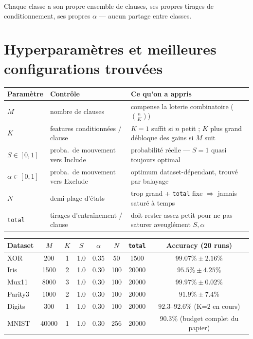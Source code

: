 \documentclass[12pt,a4paper]{article}
\newcommand{\Inc}{\ensuremath{\mathrm{Include}}}
\newcommand{\Exc}{\ensuremath{\mathrm{Exclude}}}
\newcommand{\code}[1]{\texttt{#1}}
\theoremstyle{remark}
\begin{document}
Chaque classe a son propre ensemble de clauses, ses propres tirages de
conditionnement, ses propres $\alpha$ --- aucun partage entre classes.

\section{Hyperparamètres et meilleures configurations trouvées}

\begin{center}
\renewcommand{\arraystretch}{1.3}
\begin{tabular}{lll}
\toprule
Paramètre & Contrôle & Ce qu'on a appris \\
\midrule
$M$ & nombre de clauses & compense la loterie combinatoire ($\binom{n}{K}$) \\
$K$ & features conditionnées / clause & $K{=}1$ suffit si $n$ petit ; $K$ plus grand débloque des gains si $M$ suit \\
$S\in[0,1]$ & proba.\ de mouvement vers \Inc & probabilité réelle --- $S{=}1$ quasi toujours optimal \\
$\alpha\in[0,1]$ & proba.\ de mouvement vers \Exc & optimum dataset-dépendant, trouvé par balayage \\
$N$ & demi-plage d'états & trop grand + \code{total} fixe $\Rightarrow$ jamais saturé à temps \\
\code{total} & tirages d'entraînement / clause & doit rester assez petit pour ne pas saturer aveuglément $S,\alpha$ \\
\bottomrule
\end{tabular}
\end{center}

\vspace{0.6em}

\begin{center}
\renewcommand{\arraystretch}{1.3}
\begin{tabular}{lccccccc}
\toprule
Dataset & $M$ & $K$ & $S$ & $\alpha$ & $N$ & \code{total} & Accuracy (20 runs) \\
\midrule
XOR      & 200  & 1 & 1.0 & 0.35 & 50  & 1500  & $99.07\%\pm2.16\%$ \\
Iris     & 1500 & 2 & 1.0 & 0.30 & 100 & 20000 & $95.5\%\pm4.25\%$ \\
Mux11    & 8000 & 3 & 1.0 & 0.30 & 100 & 20000 & $99.97\%\pm0.02\%$ \\
Parity3  & 1000 & 2 & 1.0 & 0.30 & 100 & 20000 & $91.9\%\pm7.4\%$ \\
Digits   & 300  & 1 & 1.0 & 0.30 & 100 & 20000 & $92.3$--$92.6\%$ (K=2 en cours) \\
MNIST    & 40000 & 1 & 1.0 & 0.30 & 256 & 20000 & $90.3\%$ (budget complet du papier) \\
\bottomrule
\end{tabular}
\end{center}
\end{document}
